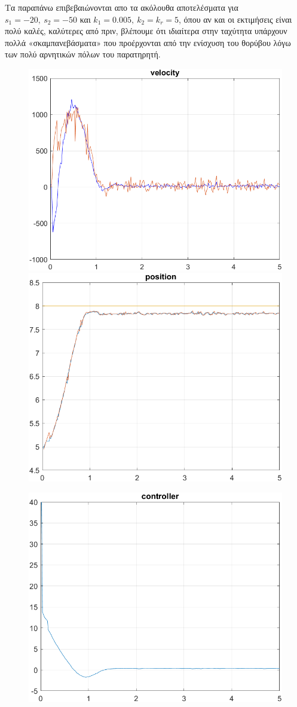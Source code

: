 Τα παραπάνω επιβεβαιώνονται απο τα ακόλουθα αποτελέσματα για $s_1 = -20,\ s_2 = -50$ και $k_1 = 0.005,\ k_2 = k_r = 5$, όπου αν και οι εκτιμήσεις είναι πολύ καλές, καλύτερες από πριν, βλέπουμε ότι ιδιαίτερα στην ταχύτητα υπάρχουν πολλά «σκαμπανεβάσματα» που προέρχονται από την ενίσχυση του θορύβου λόγω των πολύ αρνητικών πόλων του παρατηρητή.
\begin{figure}[H]
    \centering
    \begin{minipage}{0.45\textwidth}
        \includegraphics[width=\linewidth]{Images/lab4/2/vel4.2.png}
    \end{minipage}
    \hfill
    \begin{minipage}{0.45\textwidth}
        \includegraphics[width=\linewidth]{Images/lab4/2/pos4.2.png}
    \end{minipage}
\end{figure}
\begin{figure}[H]
    \centering
    \includegraphics[width=0.5\linewidth]{Images/lab4/2/con4.2.png}
\end{figure}
